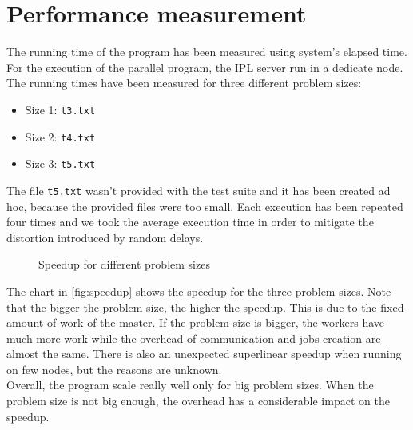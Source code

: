 \documentclass{article}
\begin{document}
\section{Performance measurement}
The running time of the program has been measured using system's elapsed time. For the execution of the parallel program, the IPL server run in a dedicate node. The running times have been measured for three different problem sizes:
\begin{itemize}
    \item Size 1: \texttt{t3.txt}
    \item Size 2: \texttt{t4.txt}
    \item Size 3: \texttt{t5.txt}
\end{itemize}
The file \texttt{t5.txt} wasn't provided with the test suite and it has been created ad hoc, because the provided files were too small. Each execution has been repeated four times and we took the average execution time in order to mitigate the distortion introduced by random delays. \\
\begin{figure}
\centering
{}
\caption{Speedup for different problem sizes} \label{fig:speedup}
\end{figure}
The chart in \autoref{fig:speedup} shows the speedup for the three problem sizes. Note that the bigger the problem size, the higher the speedup. This is due to the fixed amount of work of the master. If the problem size is bigger, the workers have much more work while the overhead of communication and jobs creation are almost the same. There is also an unexpected superlinear speedup when running on few nodes, but the reasons are unknown. \\
Overall, the program scale really well only for big problem sizes. When the problem size is not big enough, the overhead has a considerable impact on the speedup.
\end{document}
